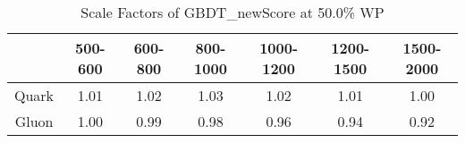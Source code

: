 \begin{table}
\centering
\caption{Scale Factors of GBDT_newScore at 50.0\% WP}
\label{tab:GBDT_newScore_0.5_Gluon}
\begin{tabular}{ccccccc}
\toprule
{} &  500-600 &  600-800 &  800-1000 &  1000-1200 &  1200-1500 &  1500-2000 \\
\midrule
Quark &     1.01 &     1.02 &      1.03 &       1.02 &       1.01 &       1.00 \\
Gluon &     1.00 &     0.99 &      0.98 &       0.96 &       0.94 &       0.92 \\
\bottomrule
\end{tabular}
\end{table}
